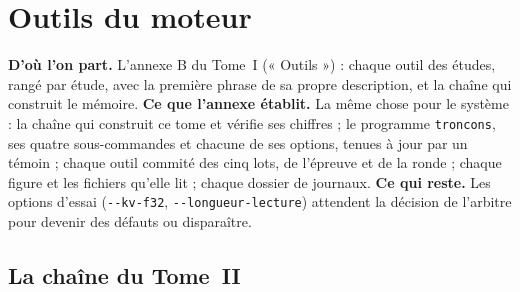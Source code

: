 \newcommand{\option}[1]{\texttt{-{}-#1}}
\chapter{Outils du moteur}\label{t2ann:outils}

\begin{origine}
\textbf{D'où l'on part.} L'annexe B du Tome~I (« Outils ») : chaque outil des études, rangé par étude, avec la première phrase de sa propre description, et la chaîne qui construit le mémoire.
\textbf{Ce que l'annexe établit.} La même chose pour le système : la chaîne qui construit ce tome et vérifie ses chiffres ; le programme \texttt{troncons}, ses quatre sous-commandes et chacune de ses options, tenues à jour par un témoin ; chaque outil commité des cinq lots, de l'épreuve et de la ronde ; chaque figure et les fichiers qu'elle lit ; chaque dossier de journaux.
\textbf{Ce qui reste.} Les options d'essai (\option{kv-f32}, \option{longueur-lecture}) attendent la décision de l'arbitre pour devenir des défauts ou disparaître.
\end{origine}

\section{La chaîne du Tome~II}\label{t2ann:sec:chaine}


